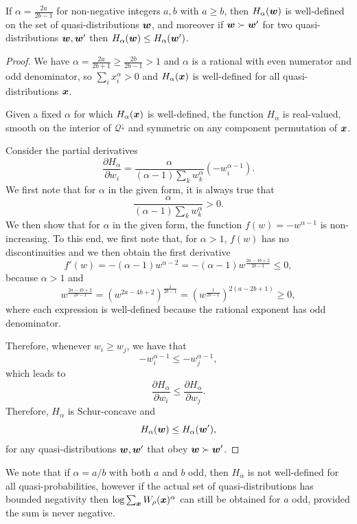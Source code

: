\documentclass[pra,
aps,
twocolumn,
superscriptaddress,
groupedaddress,
nofootinbib,
reprint
]{revtex4-1}
\begin{document}
\begingroup
\def\thetheorem{\ref{thm:HSchur}}
\begin{theorem}
	If $\alpha = \frac{2a}{2b-1}$ for non-negative integers $a,b$ with $a \geq b$, then $H_\alpha(\boldsymbol{w})$ is well-defined on the set of quasi-distributions $\boldsymbol{w}$, and moreover if $\boldsymbol{w} \succ \boldsymbol{w}'$ for two quasi-distributions $\boldsymbol{w}, \boldsymbol{w}'$ then $H_\alpha (\boldsymbol{w}) \leq H_\alpha(\boldsymbol{w}')$.
\end{theorem}
\addtocounter{theorem}{-1}
\endgroup
\begin{proof}
We have $\alpha = \frac{2a}{2b+1} \geq \frac{2b}{2b-1} > 1$ and $\alpha$ is a rational with even numerator and odd denominator, so $\sum_i x_i^\alpha > 0$ and $H_\alpha(\boldsymbol{x})$ is well-defined for all quasi-distributions $\boldsymbol{x}$.

Given a fixed $\alpha$ for which $H_\alpha(\boldsymbol{x})$ is well-defined, the function $H_\alpha$ is real-valued, smooth on the interior of $\mathcal{Q}^\downarrow$ and symmetric on any component permutation of $\boldsymbol{x}$.

Consider the partial derivatives
\begin{equation}
	\frac{\partial H_\alpha}{\partial w_i} = \frac{\alpha}{(\alpha-1)\sum_k{w_k^\alpha}}(-w_i^{\alpha-1}).
\end{equation}
We first note that for $\alpha$ in the given form, it is always true that
\begin{equation}
	\frac{\alpha}{(\alpha-1)\sum_k{w_k^\alpha}} > 0.
\end{equation}
We then show that for $\alpha$ in the given form, the function $f(w) = -w^{\alpha - 1}$ is non-increasing.
To this end, we first note that, for $\alpha > 1$, $f(w)$ has no discontinuities and we then obtain the first derivative
\begin{equation}
	f'(w) = -(\alpha - 1) w^{\alpha-2} = -(\alpha - 1)w^{\frac{2a-4b+2}{2b-1}} \leq 0,
\end{equation}
because $\alpha > 1$ and
\begin{equation}
	w^{\frac{2a-4b+2}{2b-1}} = \left(w^{2a-4b+2}\right)^{\frac{1}{2b-1}} = \left(w^{\frac{1}{2b-1}}\right)^{2(a-2b+1)} \geq 0,
\end{equation}
where each expression is well-defined because the rational exponent has odd denominator.

Therefore, whenever $w_i \geq w_j$, we have that 
\begin{equation}
	-w_i^{\alpha-1} \leq -w_j^{\alpha-1},
\end{equation}
which leads to
\begin{equation}
	\frac{\partial H_\alpha}{\partial w_i} \leq \frac{\partial H_\alpha}{\partial w_j}.
\end{equation}
Therefore, $H_\alpha$ is Schur-concave and
\begin{equation}
	H_\alpha(\boldsymbol{w}) \leq H_\alpha(\boldsymbol{w}'),
\end{equation}
for any quasi-distributions $\boldsymbol{w}, \boldsymbol{w}'$ that obey $\boldsymbol{w} \succ \boldsymbol{w}'$.
\end{proof}
We note that if $\alpha =a/b$ with both $a$ and $b$ odd, then $H_\alpha$ is not well-defined for all quasi-probabilities, however if the actual set of quasi-distributions has bounded negativity then $\log \sum_{\boldsymbol{x}} W_\rho(\boldsymbol{x})^\alpha$ can still be obtained for $a$ odd, provided the sum is never negative.
\end{document}
